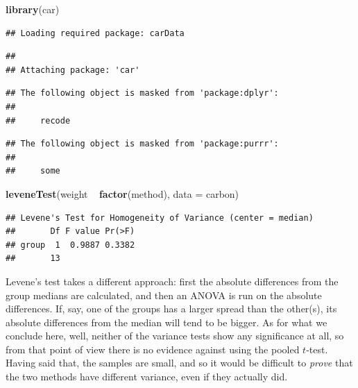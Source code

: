 \documentclass[]{tufte-book}
\newenvironment{Shaded}{}{}
\newcommand{\DataTypeTok}[1]{\textcolor[rgb]{0.56,0.13,0.00}{#1}}
\newcommand{\KeywordTok}[1]{\textcolor[rgb]{0.00,0.44,0.13}{\textbf{#1}}}
\newcommand{\NormalTok}[1]{#1}
\newcommand{\OperatorTok}[1]{\textcolor[rgb]{0.40,0.40,0.40}{#1}}
\newcommand{\StringTok}[1]{\textcolor[rgb]{0.25,0.44,0.63}{#1}}
\theoremstyle{definition}
\theoremstyle{definition}
\theoremstyle{definition}
\theoremstyle{remark}
\begin{document}
\begin{Shaded}
\begin{Highlighting}[]
\KeywordTok{library}\NormalTok{(car)}
\end{Highlighting}
\end{Shaded}

\begin{verbatim}
## Loading required package: carData
\end{verbatim}

\begin{verbatim}
## 
## Attaching package: 'car'
\end{verbatim}

\begin{verbatim}
## The following object is masked from 'package:dplyr':
## 
##     recode
\end{verbatim}

\begin{verbatim}
## The following object is masked from 'package:purrr':
## 
##     some
\end{verbatim}

\begin{Shaded}
\begin{Highlighting}[]
\KeywordTok{leveneTest}\NormalTok{(weight }\OperatorTok{~}\StringTok{ }\KeywordTok{factor}\NormalTok{(method), }\DataTypeTok{data =}\NormalTok{ carbon)}
\end{Highlighting}
\end{Shaded}

\begin{verbatim}
## Levene's Test for Homogeneity of Variance (center = median)
##       Df F value Pr(>F)
## group  1  0.9887 0.3382
##       13
\end{verbatim}

Levene's test takes a different approach: first the absolute differences
from the group medians are calculated, and then an ANOVA is run on the
absolute differences. If, say, one of the groups has a larger spread
than the other(s), its absolute differences from the median will tend to
be bigger.
As for what we conclude here, well, neither of the variance tests show
any significance at all, so from that point of view there is no evidence
against using the pooled \(t\)-test. Having said that, the samples are
small, and so it would be difficult to \emph{prove} that the two methods
have different variance, even if they actually did.
\end{document}
